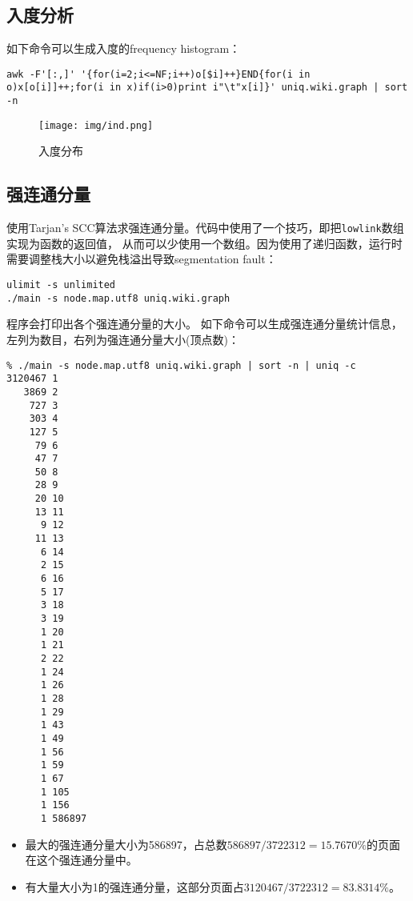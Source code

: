 \subsection{入度分析}

如下命令可以生成入度的frequency histogram：

\begin{verbatim}
awk -F'[:,]' '{for(i=2;i<=NF;i++)o[$i]++}END{for(i in o)x[o[i]]++;for(i in x)if(i>0)print i"\t"x[i]}' uniq.wiki.graph | sort -n
\end{verbatim}

\begin{figure}[H]
  \centering
  \texttt{[image: img/ind.png]}
  \caption{入度分布}
\end{figure}

\subsection{强连通分量}

使用Tarjan's SCC算法求强连通分量。代码中使用了一个技巧，即把\texttt{lowlink}数组实现为函数的返回值，
从而可以少使用一个数组。因为使用了递归函数，运行时需要调整栈大小以避免栈溢出导致segmentation fault：

\begin{verbatim}
ulimit -s unlimited
./main -s node.map.utf8 uniq.wiki.graph
\end{verbatim}

程序会打印出各个强连通分量的大小。
如下命令可以生成强连通分量统计信息，左列为数目，右列为强连通分量大小(顶点数)：

\begin{verbatim}
% ./main -s node.map.utf8 uniq.wiki.graph | sort -n | uniq -c
3120467 1
   3869 2
    727 3
    303 4
    127 5
     79 6
     47 7
     50 8
     28 9
     20 10
     13 11
      9 12
     11 13
      6 14
      2 15
      6 16
      5 17
      3 18
      3 19
      1 20
      1 21
      2 22
      1 24
      1 26
      1 28
      1 29
      1 43
      1 49
      1 56
      1 59
      1 67
      1 105
      1 156
      1 586897
\end{verbatim}

\begin{itemize}
  \item 最大的强连通分量大小为586897，占总数$586897/3722312=15.7670\%$的页面在这个强连通分量中。
  \item 有大量大小为1的强连通分量，这部分页面占$3120467 / 3722312=83.8314\%$。
\end{itemize}


